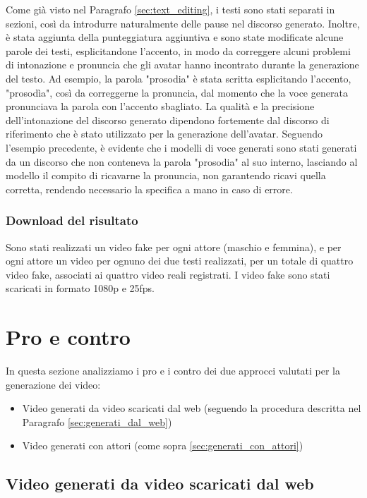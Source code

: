Come già visto nel Paragrafo \ref{sec:text_editing}, i testi sono stati separati in sezioni, così da introdurre naturalmente delle pause nel discorso generato. Inoltre, è stata aggiunta della punteggiatura aggiuntiva e sono state modificate alcune parole dei testi, esplicitandone l'accento, in modo da correggere alcuni problemi di intonazione e pronuncia che gli avatar hanno incontrato durante la generazione del testo. Ad esempio, la parola "prosodia" è stata scritta esplicitando l'accento, "prosodìa", così da correggerne la pronuncia, dal momento che la voce generata pronunciava la parola con l'accento sbagliato. La qualità e la precisione dell'intonazione del discorso generato dipendono fortemente dal discorso di riferimento che è stato utilizzato per la generazione dell'avatar. Seguendo l'esempio precedente, è evidente che i modelli di voce generati sono stati generati da un discorso che non conteneva la parola "prosodia" al suo interno, lasciando al modello il compito di ricavarne la pronuncia, non garantendo ricavi quella corretta, rendendo necessario la specifica a mano in caso di errore.

\subsubsection{Download del risultato}

Sono stati realizzati un video fake per ogni attore (maschio e femmina), e per ogni attore un video per ognuno dei due testi realizzati, per un totale di quattro video fake, associati ai quattro video reali registrati. I video fake sono stati scaricati in formato 1080p e 25fps.

\section{Pro e contro}

In questa sezione analizziamo i pro e i contro dei due approcci valutati per la generazione dei video:
\begin{itemize}
    \item Video generati da video scaricati dal web (seguendo la procedura descritta nel Paragrafo \ref{sec:generati_dal_web})
    \item Video generati con attori (come sopra \ref{sec:generati_con_attori})
\end{itemize}

\subsection{Video generati da video scaricati dal web}

